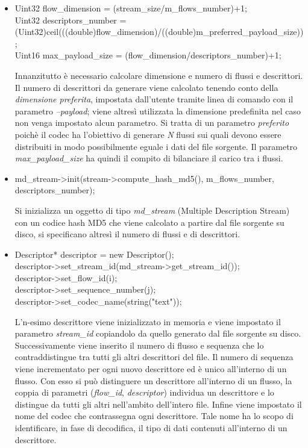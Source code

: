 \begin{itemize}
 \item \begin{code}
Uint32 flow\_dimension = (stream\_size/m\_flows\_number)+1;\\
Uint32 descriptors\_number = \\(Uint32)ceil(((double)flow\_dimension)/((double)m\_preferred\_payload\_size));\\
Uint16 max\_payload\_size = (flow\_dimension/descriptors\_number)+1;\\
\end{code}

Innanzitutto \`e necessario calcolare dimensione e numero di flussi e descrittori. Il numero di descrittori da generare viene calcolato tenendo conto della \emph{dimensione preferita}, impostata dall'utente tramite linea di comando con il parametro \emph{--payload}; viene altres\`i utilizzata la dimensione predefinita nel caso non venga impostato alcun parametro. Si tratta di un parametro \emph{preferito} poich\`e il codec ha l'obiettivo di generare \emph{N} flussi sui quali devono essere distribuiti in modo possibilmente eguale i dati del file sorgente. Il parametro \textit{max\_payload\_size} ha quindi il compito di bilanciare il carico tra i flussi.

 \item \begin{code}
md\_stream->init(stream->compute\_hash\_md5(), m\_flows\_number, descriptors\_number);\\
\end{code}
Si inizializza un oggetto di tipo \textit{md\_stream} (Multiple Description Stream) con un codice hash MD5 che viene calcolato a partire dal file sorgente su disco, si specificano altres\`i il numero di flussi e di descrittori.

 \item \begin{code}
Descriptor* descriptor = new Descriptor();\\
descriptor->set\_stream\_id(md\_stream->get\_stream\_id());\\
descriptor->set\_flow\_id(i);\\
descriptor->set\_sequence\_number(j);\\
descriptor->set\_codec\_name(string("text"));\\
\end{code}
L'n-esimo descrittore viene inizializzato in memoria e viene impostato il parametro \textit{stream\_id} copiandolo da quello generato dal file sorgente su disco. Successivamente viene inserito il numero di flusso e sequenza che lo contraddistingue tra tutti gli altri descrittori del file. Il numero di sequenza viene incrementato per ogni nuovo descrittore ed è unico all'interno di un flusso. Con esso si pu\`o distinguere un descrittore all'interno di un flusso, la coppia di parametri (\textit{flow\_id}, \textit{descriptor}) individua un descrittore e lo distingue da tutti gli altri nell'ambito dell'intero file. Infine viene impostato il nome del codec che contrassegna ogni descrittore. Tale nome ha lo scopo di identificare, in fase di decodifica, il tipo di dati contenuti all'interno di un descrittore.


\end{itemize}
